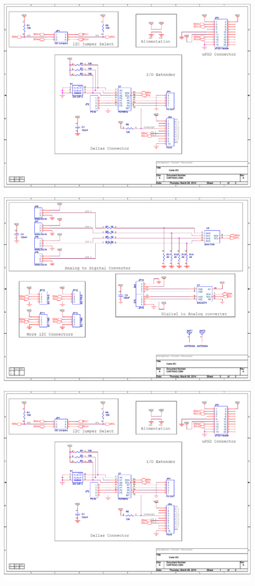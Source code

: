 \begin{multicols}{4}
\includegraphics[scale=0.2,angle=90]{Figures/OrCad/ExtensionI2C1.pdf}
\includegraphics[scale=0.2,angle=90]{Figures/OrCad/ExtensionI2C2.pdf}
\includegraphics[scale=0.2,angle=90]{Figures/OrCad/ExtensionI2C1.pdf}

\end{multicols}
